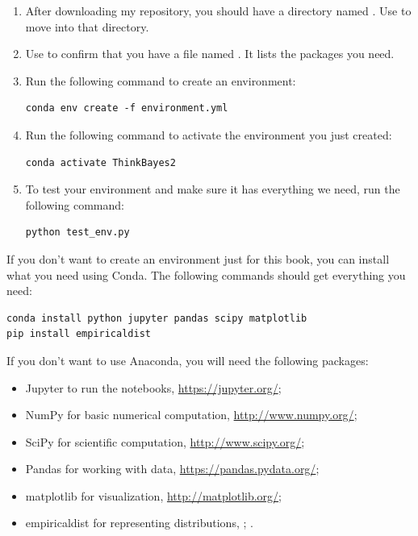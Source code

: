 \documentclass[12pt]{book}
\theoremstyle{exercise}
\begin{document}
\begin{enumerate}

\item After downloading my repository, you should have a directory named .  Use  to move into that directory.

\item Use  to confirm that you have a file named .  It lists the packages you need.

\item Run the following command to create an environment:

\begin{verbatim}
conda env create -f environment.yml
\end{verbatim}

\item Run the following command to activate the environment you just created:

\begin{verbatim}
conda activate ThinkBayes2
\end{verbatim}

\item To test your environment and make sure it has everything we need, run the following command:

\begin{verbatim}
python test_env.py
\end{verbatim}

\end{enumerate}

If you don't want to create an environment just for this book, you can install what you need using Conda.
The following commands should get everything you need:

\begin{verbatim}
conda install python jupyter pandas scipy matplotlib
pip install empiricaldist
\end{verbatim}

If you don't want to use Anaconda, you will need the following
packages:

\begin{itemize}

\item Jupyter to run the notebooks, \url{https://jupyter.org/};

\item NumPy for basic numerical computation, \url{http://www.numpy.org/};

\item SciPy for scientific computation, \url{http://www.scipy.org/};

\item Pandas for working with data, \url{https://pandas.pydata.org/};

\item matplotlib for visualization, \url{http://matplotlib.org/};

\item empiricaldist for representing distributions, \url{};
.

\end{itemize}
\end{document}
